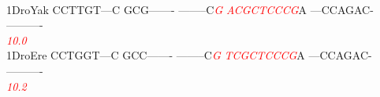 \documentclass[11pt,twoside,reqno,a4paper]{article}
\begin{document}
{\hspace*{4\charwidth}\hspace*{7\charwidth}\hspace*{1\charwidth}\hspace*{1\charwidth}\hspace*{1\charwidth}\hspace*{1\charwidth}\hspace*{1\charwidth}\hspace*{1\charwidth}\\
1\hspace*{3\charwidth}DroYak	CCTTGT---C	GCG-------	--------C\textit{\textcolor{Red}{G}}	\textit{\textcolor{Red}{A}}\textit{\textcolor{Red}{C}}\textit{\textcolor{Red}{G}}\textit{\textcolor{Red}{C}}\textit{\textcolor{Red}{T}}\textit{\textcolor{Red}{C}}\textit{\textcolor{Red}{C}}\textit{\textcolor{Red}{C}}\textit{\textcolor{Red}{G}}A	---CCAGAC-	----------	\\
\hspace*{4\charwidth}\hspace*{7\charwidth}\hspace*{1\charwidth}\hspace*{1\charwidth}\hspace*{29\charwidth}\textit{\textcolor{Red}{10.0}}\hspace*{1\charwidth}\hspace*{1\charwidth}\hspace*{1\charwidth}\hspace*{1\charwidth}\\
1\hspace*{3\charwidth}DroEre	CCTGGT---C	GCC-------	--------C\textit{\textcolor{Red}{G}}	\textit{\textcolor{Red}{T}}\textit{\textcolor{Red}{C}}\textit{\textcolor{Red}{G}}\textit{\textcolor{Red}{C}}\textit{\textcolor{Red}{T}}\textit{\textcolor{Red}{C}}\textit{\textcolor{Red}{C}}\textit{\textcolor{Red}{C}}\textit{\textcolor{Red}{G}}A	---CCAGAC-	----------	\\
\hspace*{4\charwidth}\hspace*{7\charwidth}\hspace*{1\charwidth}\hspace*{1\charwidth}\hspace*{29\charwidth}\textit{\textcolor{Red}{10.2}}\hspace*{1\charwidth}\hspace*{1\charwidth}\hspace*{1\charwidth}\hspace*{1\charwidth}\\
}
\end{document}
